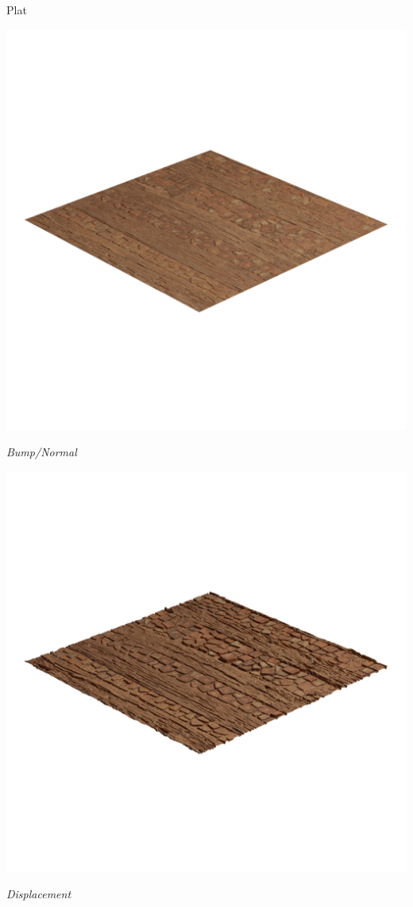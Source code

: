 \documentclass[11pt,class=report,crop=false]{standalone}
\begin{document}
\begin{center}
\begin{minipage}{0.32\textwidth}
	Plat
\end{minipage}	
\begin{minipage}{0.32\textwidth}
	\center
	\includegraphics[scale=\myscale,scale=0.15,trim={0 8cm 0 8cm},clip]{figures/texture-wood-bump}
	
		
	\emph{Bump/Normal}
\end{minipage}	
\begin{minipage}{0.32\textwidth}
	\center
	\includegraphics[scale=\myscale,scale=0.15,trim={0 8cm 0 8cm},clip]{figures/texture-wood-bump-dis1}
	
		
   \emph{Displacement}	
\end{minipage}	
\end{center}
\end{document}
